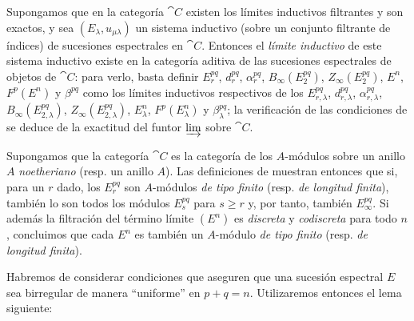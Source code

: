 \documentclass[oneside]{amsart}
\renewcommand{\geq}{\geqslant}
\let\EGAOriginalLabel\label
\renewcommand{\label}[1]{\phantomsection\EGAOriginalLabel{#1}}
\begin{document}
\begin{env}[11.1.7]
\label{0.11.1.7}
Supongamos que en la categoría $\cat{C}$ existen los límites inductivos filtrantes y son exactos, y sea $(E_\lambda,u_{\mu\lambda})$ un sistema inductivo (sobre un conjunto filtrante de índices) de sucesiones espectrales en $\cat{C}$.
Entonces el \emph{límite inductivo} de este sistema inductivo existe en la categoría aditiva de las sucesiones espectrales de objetos de $\cat{C}$: para verlo, basta definir $E_r^{pq}$, $d_r^{pq}$, $\alpha_r^{pq}$, $B_\infty(E_2^{pq})$, $Z_\infty(E_2^{pq})$, $E^n$, $F^p(E^n)$ y $\beta^{pq}$ como los límites inductivos respectivos de los $E_{r,\lambda}^{pq}$, $d_{r,\lambda}^{pq}$, $\alpha_{r,\lambda}^{pq}$, $B_\infty(E_{2,\lambda}^{pq})$, $Z_\infty(E_{2,\lambda}^{pq})$, $E_\lambda^n$, $F^p(E_\lambda^n)$ y $\beta_\lambda^{pq}$; la verificación de las condiciones de  se deduce de la exactitud del funtor $\varinjlim$ sobre $\cat{C}$.
\end{env}

\begin{remark}[11.1.8]
\label{0.11.1.8}
Supongamos que la categoría $\cat{C}$ es la categoría de los $A$-módulos sobre un anillo $A$ \emph{noetheriano} (resp. un anillo $A$).
Las definiciones de  muestran entonces que si, para un $r$ dado, los $E_r^{pq}$ son $A$-módulos \emph{de tipo finito} (resp. \emph{de longitud finita}), también lo son todos los módulos $E_s^{pq}$ para $s\geq r$ y, por tanto, también $E_\infty^{pq}$.
Si además la filtración del término límite $(E^n)$ es \emph{discreta} y \emph{codiscreta} para todo $n$, concluimos que cada $E^n$ es también un $A$-módulo \emph{de tipo finito} (resp. \emph{de longitud finita}).
\end{remark}

\begin{env}[11.1.9]
\label{0.11.1.9}
Habremos de considerar condiciones que aseguren que una sucesión espectral $E$ sea birregular de manera ``uniforme'' en $p+q=n$.
Utilizaremos entonces el lema siguiente:
\end{env}
\end{document}
